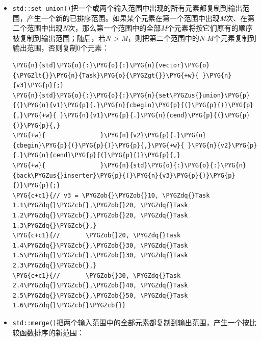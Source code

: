 \begin{itemize}
\item \texttt{std::\allowbreak{}set\_\allowbreak{}union()}把一个或两个输入范围中出现的所有元素都复制到输出范围，产生一个新的已排序范围。如果某个元素在第一个范围中出现\textit{M}次、在第二个范围中出现\textit{N}次，那么第一个范围中的全部\textit{M}个元素将按它们原有的顺序被复制到输出范围；随后，若\textit{N > M}，则把第二个范围中的\textit{N-M}个元素复制到输出范围，否则复制0个元素：



\begin{codeblockbg}
\begin{Verbatim}[commandchars=\\\{\},breaklines=true,breakanywhere=true,fontsize=\codefont,xleftmargin=17bp]
\PYG{n}{std}\PYG{o}{:}\PYG{o}{:}\PYG{n}{vector}\PYG{o}{\PYGZlt{}}\PYG{n}{Task}\PYG{o}{\PYGZgt{}}\PYG{+w}{ }\PYG{n}{v3}\PYG{p}{;}
\PYG{n}{std}\PYG{o}{:}\PYG{o}{:}\PYG{n}{set\PYGZus{}union}\PYG{p}{(}\PYG{n}{v1}\PYG{p}{.}\PYG{n}{cbegin}\PYG{p}{(}\PYG{p}{)}\PYG{p}{,}\PYG{+w}{ }\PYG{n}{v1}\PYG{p}{.}\PYG{n}{cend}\PYG{p}{(}\PYG{p}{)}\PYG{p}{,}
\PYG{+w}{               }\PYG{n}{v2}\PYG{p}{.}\PYG{n}{cbegin}\PYG{p}{(}\PYG{p}{)}\PYG{p}{,}\PYG{+w}{ }\PYG{n}{v2}\PYG{p}{.}\PYG{n}{cend}\PYG{p}{(}\PYG{p}{)}\PYG{p}{,}
\PYG{+w}{               }\PYG{n}{std}\PYG{o}{:}\PYG{o}{:}\PYG{n}{back\PYGZus{}inserter}\PYG{p}{(}\PYG{n}{v3}\PYG{p}{)}\PYG{p}{)}\PYG{p}{;}
\PYG{c+c1}{// v3 = \PYGZob{}\PYGZob{}10, \PYGZdq{}Task 1.1\PYGZdq{}\PYGZcb{},\PYGZob{}20, \PYGZdq{}Task 1.2\PYGZdq{}\PYGZcb{},\PYGZob{}20, \PYGZdq{}Task 1.3\PYGZdq{}\PYGZcb{},}
\PYG{c+c1}{//       \PYGZob{}20, \PYGZdq{}Task 1.4\PYGZdq{}\PYGZcb{},\PYGZob{}30, \PYGZdq{}Task 1.5\PYGZdq{}\PYGZcb{},\PYGZob{}30, \PYGZdq{}Task 2.3\PYGZdq{}\PYGZcb{},}
\PYG{c+c1}{//       \PYGZob{}30, \PYGZdq{}Task 2.4\PYGZdq{}\PYGZcb{},\PYGZob{}40, \PYGZdq{}Task 2.5\PYGZdq{}\PYGZcb{},\PYGZob{}50, \PYGZdq{}Task 1.6\PYGZdq{}\PYGZcb{}\PYGZcb{}}
\end{Verbatim}
\end{codeblockbg}



\item \texttt{std::\allowbreak{}merge()}把两个输入范围中的全部元素都复制到输出范围，产生一个按比较函数排序的新范围：




\end{itemize}
